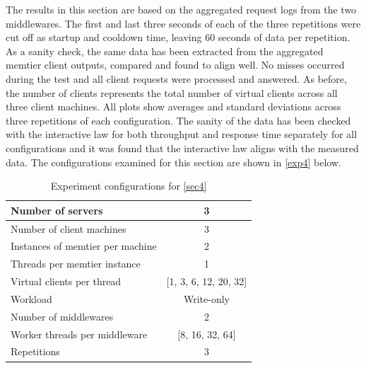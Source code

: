 \documentclass[11pt,a4paper]{article}
\begin{document}
The results in this section are based on the aggregated request logs from the two middlewares. The first and last three seconds of each of the three repetitions were cut off as startup and cooldown time, leaving 60 seconds of data per repetition. As a sanity check, the same data has been extracted from the aggregated memtier client outputs, compared and found to align well. No misses occurred during the test and all client requests were processed and answered. As before, the number of clients represents the total number of virtual clients across all three client machines. All plots show averages and standard deviations across three repetitions of each configuration. The sanity of the data has been checked with the interactive law for both throughput and response time separately for all configurations and it was found that the interactive law aligns with the measured data. The configurations examined for this section are shown in \autoref{exp4} below.

\begin{table}
    \centering
	\begin{tabular}{|l|c|}
		\hline Number of servers                & 3                         \\ 
		\hline Number of client machines        & 3                         \\ 
		\hline Instances of memtier per machine & 2                         \\ 
		\hline Threads per memtier instance     & 1                         \\
		\hline Virtual clients per thread       & [1, 3, 6, 12, 20, 32]     \\ 
		\hline Workload                         & Write-only                \\
		\hline Number of middlewares            & 2                         \\
		\hline Worker threads per middleware    & [8, 16, 32, 64]           \\
		\hline Repetitions                      & 3                         \\ 
		\hline 
	\end{tabular}
	\caption{Experiment configurations for \autoref{sec4}} \label{exp4}
\end{table}
\end{document}
